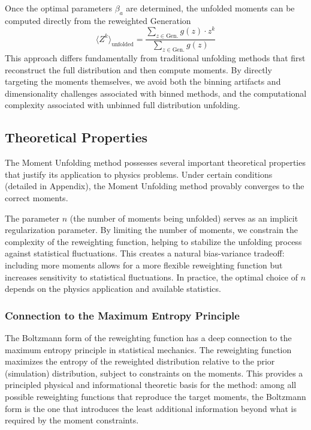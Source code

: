         Once the optimal parameters $\beta_a$ are determined, the unfolded moments can be computed directly from the reweighted Generation
        \[
            \langle Z^k \rangle_{\text{unfolded}} = \frac{\sum_{z \in \text{Gen.}} g(z) \cdot z^k}{\sum_{z \in \text{Gen.}} g(z)}
        \]
        This approach differs fundamentally from traditional unfolding methods that first reconstruct the full distribution and then compute moments.
        By directly targeting the moments themselves, we avoid both the binning artifacts and dimensionality challenges associated with binned methods, and the computational complexity associated with unbinned full distribution unfolding.
    \subsection{Theoretical Properties}
        The Moment Unfolding method possesses several important theoretical properties that justify its application to physics problems.
        Under certain conditions (detailed in Appendix), the Moment Unfolding method provably converges to the correct moments.

        The parameter $n$ (the number of moments being unfolded) serves as an implicit regularization parameter.
        By limiting the number of moments, we constrain the complexity of the reweighting function, helping to stabilize the unfolding process against statistical fluctuations.
        This creates a natural bias-variance tradeoff: including more moments allows for a more flexible reweighting function but increases sensitivity to statistical fluctuations.
        In practice, the optimal choice of $n$ depends on the physics application and available statistics.
        \subsubsection{Connection to the Maximum Entropy Principle}
            The Boltzmann form of the reweighting function has a deep connection to the maximum entropy principle in statistical mechanics.
            The reweighting function maximizes the entropy of the reweighted distribution relative to the prior (simulation) distribution, subject to constraints on the moments.
            This provides a principled physical and informational theoretic basis for the method: among all possible reweighting functions that reproduce the target moments, the Boltzmann form is the one that introduces the least additional information beyond what is required by the moment constraints.

